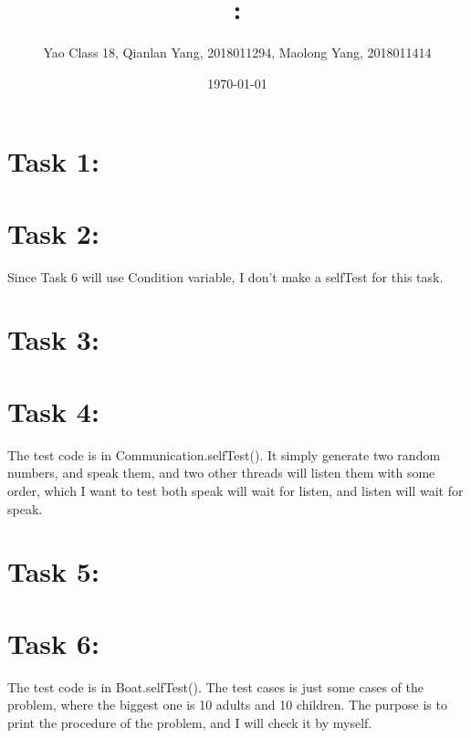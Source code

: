 \documentclass[11pt]{article}
\title{\textmd{\bf \Class: \Title}}
\date{\today}
\author{Yao Class 18, Qianlan Yang, 2018011294, Maolong Yang, 2018011414}
\begin{document}
\begin{spacing}{1.1}
\maketitle \thispagestyle{empty}







\iffalse

\begin{figure}[h]%
	\centering  %
	\texttt{[image: image.jpg]}  %
\end{figure}

\fi

\section{Task 1:}

\section{Task 2:}

Since Task 6 will use Condition variable, I don't make a selfTest for this task.

\section{Task 3:}

\section{Task 4:}

The test code is in Communication.selfTest(). It simply generate two random numbers, and speak them, and two other threads will listen them with some order, which I want to test both speak will wait for listen, and listen will wait for speak.

\section{Task 5:}

\section{Task 6:}

The test code is in Boat.selfTest(). The test cases is just some cases of the problem, where the biggest one is 10 adults and 10 children. The purpose is to print the procedure of the problem, and I will check it by myself.


\end{spacing}
\end{document}
